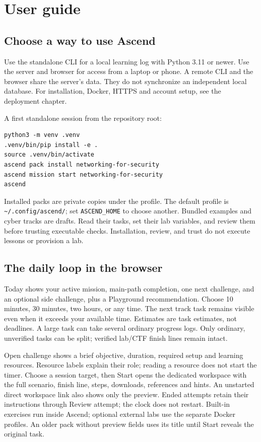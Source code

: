 \section{User guide}
\subsection{Choose a way to use Ascend}
Use the standalone CLI for a local learning log with Python 3.11 or newer. Use the
server and browser for access from a laptop or phone. A remote CLI and the browser
share the server's data. They do not synchronize an independent local database.
For installation, Docker, HTTPS and account setup, see the deployment chapter.

A first standalone session from the repository root:
\begin{verbatim}
python3 -m venv .venv
.venv/bin/pip install -e .
source .venv/bin/activate
ascend pack install networking-for-security
ascend mission start networking-for-security
ascend
\end{verbatim}
Installed packs are private copies under the profile. The default profile is
\texttt{\textasciitilde/.config/ascend/}; set \texttt{ASCEND\_HOME} to choose another.
Bundled examples and cyber tracks are drafts. Read their tasks, set their lab
variables, and review them before trusting executable checks. Installation,
review, and trust do not execute lessons or provision a lab.

\subsection{The daily loop in the browser}
Today shows your active mission, main-path completion, one next challenge, and an
optional side challenge, plus a Playground recommendation. Choose 10 minutes,
30 minutes, two hours, or any time. The next track task remains visible even when
it exceeds your available time. Estimates are task estimates, not deadlines.
A large task can take several ordinary progress logs. Only ordinary, unverified
tasks can be split; verified lab/CTF finish lines remain intact.

Open challenge shows a brief objective, duration, required setup and learning
resources. Resource labels explain their role; reading a resource does not start
the timer. Choose a
session target, then Start opens the dedicated workspace with the full scenario,
finish line, steps, downloads, references and hints. An unstarted direct workspace
link also shows only the preview. Ended attempts retain their instructions through
Review attempt; the clock does not restart. Built-in exercises run inside Ascend;
optional external labs use the separate Docker profiles. An older pack without
preview fields uses its title until Start reveals the original task.

